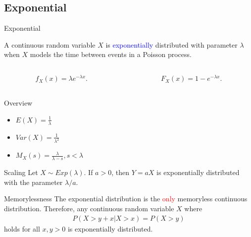 \documentclass{beamer}
\def\padding{\vspace{0.5cm}}
\def\b{\textcolor{blue}}
\def\r{\textcolor{red}}
\begin{document}
\subsection{Exponential}
\begin{frame}{Exponential}
    \begin{definition}
        A continuous random variable $X$ is \b{exponentially} distributed with parameter $\lambda$ when $X$ models the time between events in a Poisson process.\pause
        \begin{columns}
            \begin{column}{0.5\textwidth}
               \begin{align*}
                    f_X(x) = \lambda e^{- \lambda x}.
                \end{align*}
            \end{column}\pause
            \begin{column}{0.5\textwidth}
                \begin{align*}
                    F_X(x) = 1 - e^{- \lambda x}.
                \end{align*}
            \end{column}
        \end{columns}\pause\par\padding
        \begin{exampleblock}{Overview}
            \begin{itemize}
                \item $E(X) = \frac{1}{\lambda}$\pause
                \item $Var(X) = \frac{1}{\lambda^2}$\pause
                \item $M_X(s) = \frac{\lambda}{\lambda - s}, s < \lambda$
            \end{itemize}
        \end{exampleblock}
    \end{definition}
\end{frame}

\begin{frame}
    \begin{block}{Scaling}
        Let $X \sim Exp(\lambda)$. If $a > 0$, then $Y = a X$ is exponentially distributed with the parameter $\lambda / a$.
    \end{block}\pause\par\padding
    \begin{block}{Memorylessness}
        The exponential distribution is the \r{only} memoryless continuous distribution. Therefore, any continuous random variable $X$ where
        \begin{align*}
            P(X > y + x | X > x) = P(X > y)
        \end{align*}
        holds for all $x,y > 0$ is exponentially distributed.
    \end{block}
\end{frame}
\end{document}
